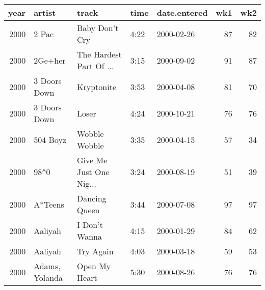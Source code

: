 \begin{tabular}{rllllrr}
  \toprule
 year & artist & track & time & date.entered & wk1 & wk2 \\ 
  \midrule
  2000 & 2 Pac & Baby Don't Cry & 4:22 & 2000-02-26 &  87 &  82 \\ 
  2000 & 2Ge+her & The Hardest Part Of ... & 3:15 & 2000-09-02 &  91 &  87 \\ 
  2000 & 3 Doors Down & Kryptonite & 3:53 & 2000-04-08 &  81 &  70 \\ 
  2000 & 3 Doors Down & Loser & 4:24 & 2000-10-21 &  76 &  76 \\ 
  2000 & 504 Boyz & Wobble Wobble & 3:35 & 2000-04-15 &  57 &  34 \\ 
  2000 & 98\verb|^|0 & Give Me Just One Nig... & 3:24 & 2000-08-19 &  51 &  39 \\ 
  2000 & A*Teens & Dancing Queen & 3:44 & 2000-07-08 &  97 &  97 \\ 
  2000 & Aaliyah & I Don't Wanna & 4:15 & 2000-01-29 &  84 &  62 \\ 
  2000 & Aaliyah & Try Again & 4:03 & 2000-03-18 &  59 &  53 \\ 
  2000 & Adams, Yolanda & Open My Heart & 5:30 & 2000-08-26 &  76 &  76 \\ 
   \bottomrule
\end{tabular}
